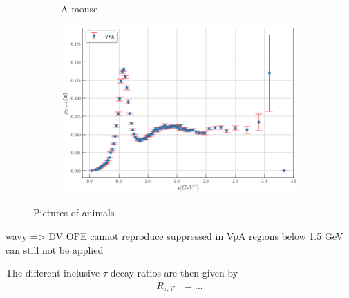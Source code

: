 \documentclass[../../index.tex]{subfiles}
\begin{document}
\begin{figure}
\begin{subfigure}[b]{0.49\textwidth}
        \caption{A mouse}
        \label{fig:mouse}
    \end{subfigure}
    \begin{subfigure}[b]{0.8\textwidth}
      \centering
      \includegraphics[width=\textwidth]{./images/specFuncAleph_VpA.png}
      \label{fig:}
    \end{subfigure}
    \caption{Pictures of animals}\label{fig:animals}
\end{figure}

wavy => DV
OPE cannot reproduce
suppressed in VpA
regions below 1.5 GeV can still not be applied

The different inclusive $\tau$-decay ratios are then given by
\begin{align}
  R_{\tau,V} &= ...
\end{align}
\end{document}
